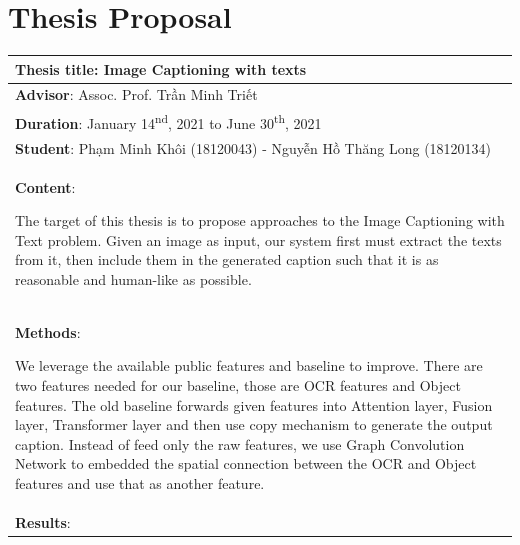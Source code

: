 \chapter{Thesis Proposal}
\begin{longtable}{|p{{{80mm}}}|c|}
\hline
\multicolumn{2}{|m{\linewidth}|}{\textbf{Thesis title}: Image Captioning with texts }\\
\hline
\multicolumn{2}{|m{\linewidth}|}{\textbf{Advisor}: Assoc. Prof. Trần Minh Triết} \\
\hline
\multicolumn{2}{|m{\linewidth}|}{\textbf{Duration}: January 14\textsuperscript{nd}, 2021 to June 30\textsuperscript{th}, 2021}\\
\hline
\multicolumn{2}{|m{\linewidth}|}{\textbf{Student}: Phạm Minh Khôi (18120043) - Nguyễn Hồ Thăng Long (18120134)}\\
\hline

\hline
\multicolumn{2}{|m{\linewidth}|}{\textbf{Content}:\par
The target of this thesis is to propose approaches to the Image Captioning with Text problem. Given an image as input, our system first must extract the texts from it, then include them in the generated caption such that it is as reasonable and human-like as possible.
}\\
\hline
\multicolumn{2}{|m{\linewidth}|}{\textbf{Methods}:\par
We leverage the available public features and baseline to improve. There are two features needed for our baseline, those are OCR features and Object features. The old baseline forwards given features into Attention layer, Fusion layer, Transformer layer and then use copy mechanism to generate the output caption. Instead of feed only the raw features, we use Graph Convolution Network to embedded the spatial connection between the OCR and Object features and use that as another feature.

}\\
\hline
\multicolumn{2}{|m{\linewidth}|}{\textbf{Results}:\par

}
\end{longtable}
